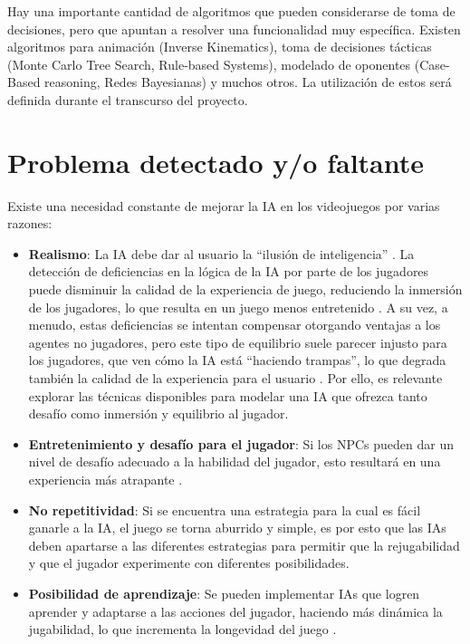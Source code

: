 \documentclass[a4paper]{article}
\begin{document}
Hay una importante cantidad de algoritmos que pueden considerarse de toma de decisiones, pero que apuntan a resolver una funcionalidad muy específica. Existen algoritmos para animación (Inverse Kinematics), toma de decisiones tácticas (Monte Carlo Tree Search, Rule-based Systems), modelado de oponentes (Case-Based reasoning, Redes Bayesianas) y muchos otros. La utilización de estos será definida durante el transcurso del proyecto.

\section{Problema detectado y/o faltante}

Existe una necesidad constante de mejorar la IA en los videojuegos por varias razones:

\begin{itemize}
    \item \textbf{Realismo}: La IA debe dar al usuario la “ilusión de inteligencia” \cite{programming_game_ai_by_example}\cite{unity_artificial_intelligence_programming}. La detección de deficiencias en la lógica de la IA por parte de los jugadores puede disminuir la calidad de la experiencia de juego, reduciendo la inmersión de los jugadores, lo que resulta en un juego menos entretenido \cite{programming_game_ai_by_example}. A su vez,  a menudo, estas deficiencias se intentan compensar otorgando ventajas a los agentes no jugadores, pero este tipo de equilibrio suele parecer injusto para los jugadores, que ven cómo la IA está “haciendo trampas”, lo que degrada también la calidad de la experiencia para el usuario \cite{programming_game_ai_by_example}. Por ello, es relevante explorar las técnicas disponibles para modelar una IA que ofrezca tanto desafío como inmersión y equilibrio al jugador.
    \item \textbf{Entretenimiento y desafío para el jugador}: Si los NPCs pueden dar un nivel de desafío adecuado a la habilidad del jugador, esto resultará en una experiencia más atrapante \cite{artificial_intelligence_for_video_game_visualization}.
    \item \textbf{No repetitividad}:  Si se encuentra una estrategia para la cual es fácil ganarle a la IA, el juego se torna aburrido y simple, es por esto que las IAs deben apartarse a las diferentes estrategias para permitir que la rejugabilidad y que el jugador experimente con diferentes posibilidades.
    \item \textbf{Posibilidad de aprendizaje}: Se pueden implementar IAs que logren aprender y adaptarse a las acciones del jugador, haciendo más dinámica la jugabilidad, lo que incrementa la longevidad del juego \cite{an_adaptive_game_ai_architecture}\cite{artificial_intelligence_for_video_game_visualization}.
\end{itemize}
\end{document}
